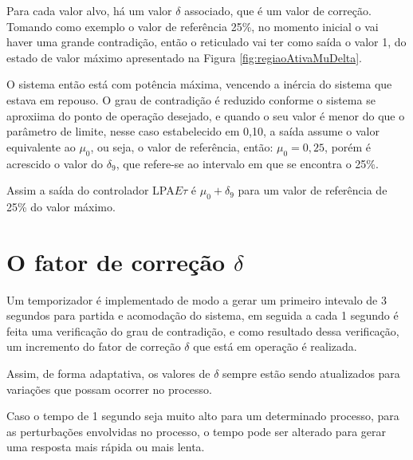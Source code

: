 Para cada valor alvo, há um valor $\delta$ associado, 
que é um valor de correção.
Tomando como exemplo o valor de referência 25\%, 
no momento inicial o vai haver uma grande contradição,
então o reticulado vai ter como saída o valor 1, 
do estado de valor máximo apresentado na 
Figura \ref{fig:regiaoAtivaMuDelta}.

O sistema então está com potência máxima, 
vencendo a inércia do sistema que estava em repouso.
O grau de contradição é reduzido conforme 
o sistema se aproxiima do ponto de operação desejado,
e quando o seu valor é menor do que 
o parâmetro de limite, nesse caso estabelecido em 0,10,
a saída assume o valor equivalente ao $\mu_0$, ou seja,
o valor de referência, então: $\mu_0 = 0,25$, porém 
é acrescido o valor do $\delta_9$, 
que refere-se ao intervalo em que se encontra o 25\%.

Assim a saída do controlador LPA$E\tau$ é 
$\mu_0 + \delta_9$
para um valor de referência de 25\% do valor máximo.











\section{O fator de correção $\delta$}

Um temporizador é implementado de modo a 
gerar um primeiro intevalo de 3 segundos para 
partida e acomodação do sistema, 
em seguida a cada 1 segundo é feita uma verificação
do grau de contradição, 
e como resultado dessa verificação, 
um incremento do fator de correção $\delta$ 
que está em operação é realizada. 

Assim, de forma adaptativa, 
os valores de $\delta$ sempre estão sendo atualizados
para variações que possam ocorrer no processo. 

Caso o tempo de 1 segundo seja muito alto para um 
determinado processo, 
para as perturbações envolvidas no processo,
o tempo pode ser alterado para gerar uma resposta 
mais rápida ou mais lenta. 



















